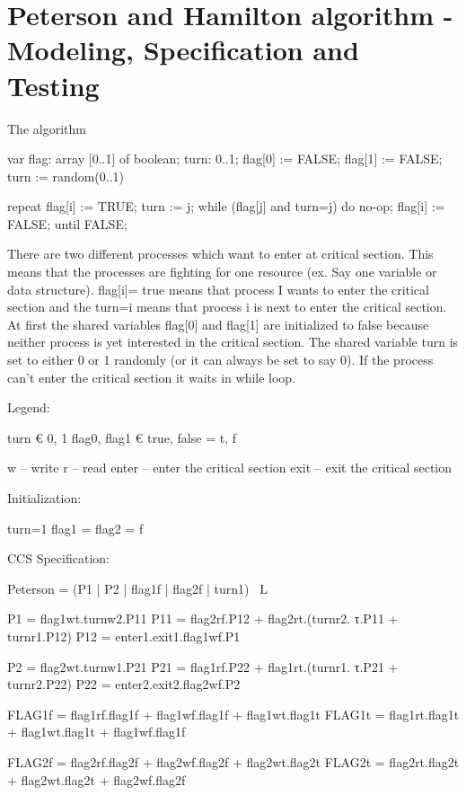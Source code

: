 \section{Peterson and Hamilton algorithm - Modeling,  Specification and Testing}
The algorithm

var flag: array [0..1] of boolean; 
turn: 0..1; 
flag[0] := FALSE; 
flag[1] := FALSE; 
turn := random(0..1) 


repeat 
flag[i] := TRUE; 
turn := j; 
while (flag[j] and turn=j) do no-op; 
flag[i] := FALSE; 
until FALSE;

There are two different processes which want to enter at critical section. 
This means that the processes are fighting for one resource (ex. Say one variable or data structure). 
flag[i]= true means that process I wants to enter the critical section and the turn=i means that process i is next to enter the critical section.
 At first the shared variables flag[0] and flag[1] are initialized to false because neither process is yet interested in the critical section. 
 The shared variable turn is set to either 0 or 1 randomly (or it can always be set to say 0). 
 If the process can’t enter the critical section it waits in while loop.

Legend:

turn € {0, 1}
flag0, flag1 € {true, false} = {t, f}

w – write
r – read
enter – enter the critical section
exit – exit the critical section

Initialization:

turn=1
flag1 = flag2 = f

CCS Specification:

Peterson = (P1 | P2 | flag1f | flag2f | turn1) \ L

P1 = flag1wt.turnw2.P11
P11 = flag2rf.P12 + flag2rt.(turnr2. τ.P11 + turnr1.P12)
P12 = enter1.exit1.flag1wf.P1

P2 = flag2wt.turnw1.P21
P21 = flag1rf.P22 + flag1rt.(turnr1. τ.P21 + turnr2.P22)
P22 = enter2.exit2.flag2wf.P2

FLAG1f = flag1rf.flag1f + flag1wf.flag1f + flag1wt.flag1t
FLAG1t = flag1rt.flag1t + flag1wt.flag1t + flag1wf.flag1f

FLAG2f = flag2rf.flag2f + flag2wf.flag2f + flag2wt.flag2t
FLAG2t = flag2rt.flag2t + flag2wt.flag2t + flag2wf.flag2f

